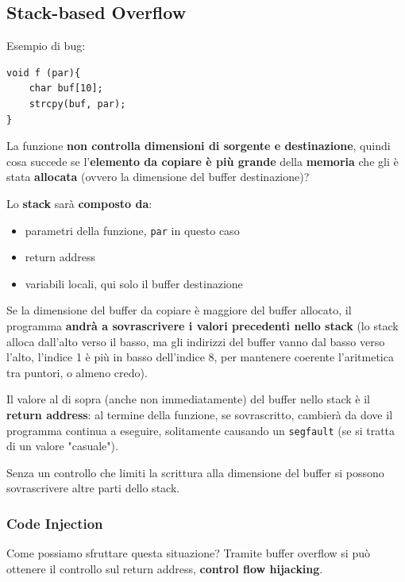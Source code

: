 \vfill

\subsection{Stack-based Overflow}

Esempio di bug: 
\begin{verbatim}
void f (par){
    char buf[10];
    strcpy(buf, par);
}
\end{verbatim}

La funzione \textbf{non controlla dimensioni di sorgente e destinazione}, quindi cosa succede se l'\textbf{elemento da copiare è più grande} della \textbf{memoria} che gli è stata \textbf{allocata} (ovvero la dimensione del buffer destinazione)?

Lo \textbf{stack} sarà \textbf{composto da}:
\begin{itemize}
	\item parametri della funzione, \texttt{par} in questo caso
    
	\item return address
	
    \item variabili locali, qui solo il buffer destinazione
\end{itemize} 

Se la dimensione del buffer da copiare è maggiore del buffer allocato, il programma \textbf{andrà a sovrascrivere i valori precedenti nello stack} (lo stack alloca dall'alto verso il basso, ma gli indirizzi del buffer vanno dal basso verso l'alto, l'indice 1 è più in basso dell'indice 8, per mantenere coerente l'aritmetica tra puntori, o almeno credo).

Il valore al di sopra (anche non immediatamente) del buffer nello stack è il \textbf{return address}: al termine della funzione, se sovrascritto, cambierà da dove il programma continua a eseguire, solitamente causando un \texttt{segfault} (se si tratta di un valore "casuale").

Senza un controllo che limiti la scrittura alla dimensione del buffer si possono sovrascrivere altre parti dello stack.

\subsubsection{Code Injection}

Come possiamo sfruttare questa situazione? Tramite buffer overflow si può ottenere il controllo sul return address, \textbf{control flow hijacking}.

